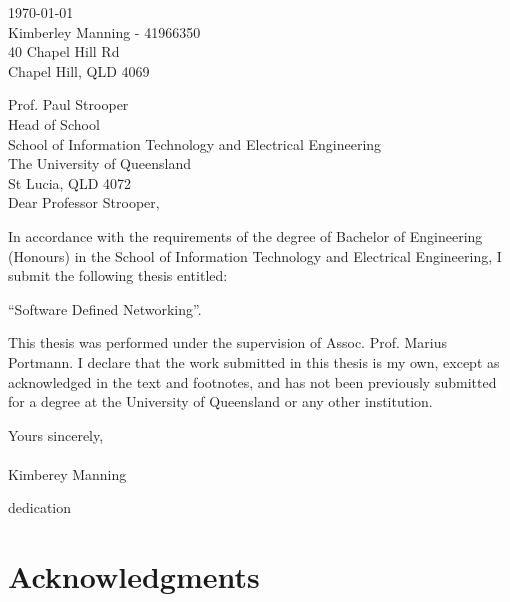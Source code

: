 \documentclass[12pt,openany,a4paper]{book}
\renewcommand{\baselinestretch}{1.2}	%
\begin{document}
\begin{flushright}
	\today\\
	Kimberley Manning - 41966350\\
	40 Chapel Hill Rd\\
	Chapel Hill, QLD 4069\\
	\medskip
	
\end{flushright}
\begin{flushleft}
  Prof. Paul Strooper\\
  Head of School\\
  School of Information Technology and Electrical Engineering\\
  The University of Queensland\\
  St Lucia, QLD 4072\\
  \bigskip\bigskip
  Dear Professor Strooper,\\
\end{flushleft}
In accordance with the requirements of the degree of Bachelor of Engineering (Honours) in the School of Information Technology and Electrical Engineering, I submit the following thesis entitled: 
\begin{center}
	``Software Defined Networking''.\\ 
\end{center}
This thesis was performed under the supervision of Assoc. Prof. Marius Portmann. I declare that the work submitted in this thesis is my own, except as acknowledged in the text and footnotes, and has not been previously submitted for a degree at the University of Queensland or any other institution.



\begin{flushleft}
	\medskip
	Yours sincerely,\\
	\bigskip
	\emph\\
	\bigskip
    Kimberey Manning
\end{flushleft}

\cleardoublepage
\vspace*{70mm}
\begin{center}
\renewcommand{\baselinestretch}{1.0}
\sl
	

        dedication


\end{center}

\cleardoublepage
\setlength{\parindent}{0cm}
\chapter{Acknowledgments}
\end{document}
